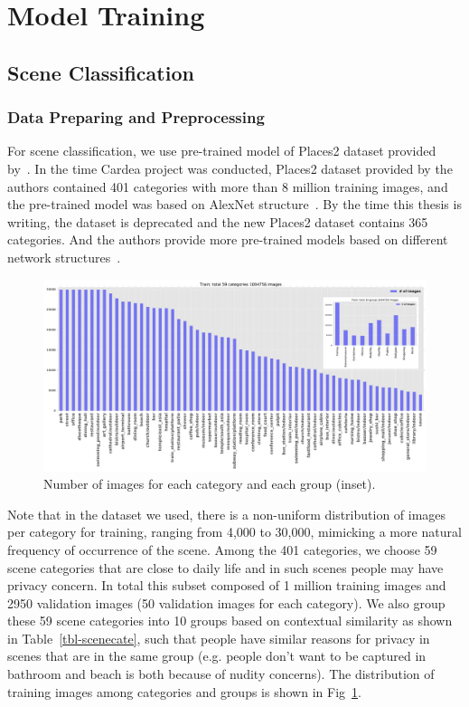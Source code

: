 \section{Model Training}

\subsection{Scene Classification}

\subsubsection{Data Preparing and Preprocessing}

For scene classification, we use pre-trained model of Places2 dataset provided by~\cite{links:places2mit}. In the time Cardea project was conducted, Places2 dataset provided by the authors contained 401 categories with more than 8 million training images, and the pre-trained model was based on AlexNet structure~\cite{krizhevsky2012imagenet}. By the time this thesis is writing, the dataset is deprecated and the new Places2 dataset contains 365 categories. And the authors provide more pre-trained models based on different network structures~\cite{links:places2pre}.

\begin{figure}[!htbp]
    \centering
    \includegraphics[width=1.0\textwidth]{figure/ch4-numdist.pdf}
    \caption{Number of images for each category and each group (inset).}
    \label{fig:ch4-scenenumdist}
\end{figure}

Note that in the dataset we used, there is a non-uniform distribution of images per category for training, ranging from 4,000 to 30,000, mimicking a more natural frequency of occurrence of the scene. Among the 401 categories, we choose 59 scene categories that are close to daily life and in such scenes people may have privacy concern. In total this subset composed of 1 million training images and 2950 validation images (50 validation images for each category). We also group these 59 scene categories into 10 groups based on contextual similarity as shown in Table~\ref{tbl-scenecate}, such that people have similar reasons for privacy in scenes that are in the same group (e.g. people don't want to be captured in bathroom and beach is both because of nudity concerns). The distribution of training images among categories and groups is shown in Fig~\ref{fig:ch4-scenenumdist}.

